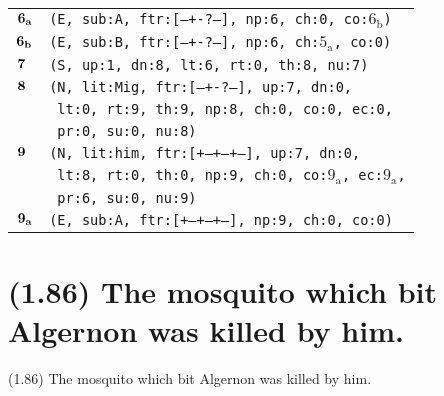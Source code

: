 \documentclass{article}
\begin{document}
\begin{minipage}{\textwidth}
{\begin{tabular}{|r|l|}
    ${\textbf{\textrm{6}}_{\textbf{\textrm{a}}}}$ & \texttt{\texttt{(E,~sub:A,~ftr:[---+-?---],~np:6,~ch:0,~co:${\textrm{6}_{\textrm{b}}}$)}} \\
    ${\textbf{\textrm{6}}_{\textbf{\textrm{b}}}}$ & \texttt{\texttt{(E,~sub:B,~ftr:[---+-?---],~np:6,~ch:${\textrm{5}_{\textrm{a}}}$,~co:0)}} \\
    ${\textbf{\textrm{7}}_{\phantom{z}}}$ & \texttt{\texttt{(S,~up:1,~dn:8,~lt:6,~rt:0,~th:8,~nu:7)}} \\
    ${\textbf{\textrm{8}}_{\phantom{z}}}$ & \texttt{\texttt{(N,~lit:Mig,~ftr:[---+-?---],~up:7,~dn:0,}} \\
    & \texttt{\texttt{~lt:0,~rt:9,~th:9,~np:8,~ch:0,~co:0,~ec:0,}} \\
    & \texttt{\texttt{~pr:0,~su:0,~nu:8)}} \\
    ${\textbf{\textrm{9}}_{\phantom{z}}}$ & \texttt{\texttt{(N,~lit:him,~ftr:[+--+--+--],~up:7,~dn:0,}} \\
    & \texttt{\texttt{~lt:8,~rt:0,~th:0,~np:9,~ch:0,~co:${\textrm{9}_{\textrm{a}}}$,~ec:${\textrm{9}_{\textrm{a}}}$,}} \\
    & \texttt{\texttt{~pr:6,~su:0,~nu:9)}} \\
    ${\textbf{\textrm{9}}_{\textbf{\textrm{a}}}}$ & \texttt{\texttt{(E,~sub:A,~ftr:[+--+--+--],~np:9,~ch:0,~co:0)}} \\
    \hline
  \end{tabular}
  }
\end{minipage}
\bigbreak

\clearpage

%
%

\section*{(1.86) The mosquito which bit Algernon was killed by him.}

\bigbreak
\begin{enumerate*}
\item[(1.86)] The mosquito which bit Algernon was killed by him.
\end{enumerate*}
\bigbreak
\end{document}

